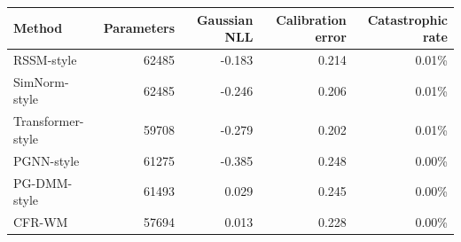 \begin{tabular}{lrrrr}
\toprule
Method & Parameters & Gaussian NLL & Calibration error & Catastrophic rate \\
\midrule
RSSM-style & 62485 & -0.183 & 0.214 & 0.01\% \\
SimNorm-style & 62485 & -0.246 & 0.206 & 0.01\% \\
Transformer-style & 59708 & -0.279 & 0.202 & 0.01\% \\
PGNN-style & 61275 & -0.385 & 0.248 & 0.00\% \\
PG-DMM-style & 61493 & 0.029 & 0.245 & 0.00\% \\
CFR-WM & 57694 & 0.013 & 0.228 & 0.00\% \\
\bottomrule
\end{tabular}
